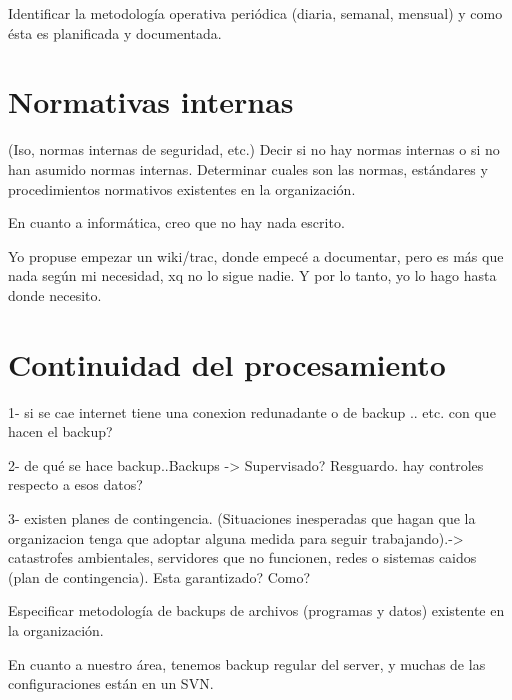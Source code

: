 \documentclass[10pt,a4paper,final]{article}
\begin{document}
Identificar la metodología operativa periódica (diaria, semanal, mensual) y como ésta es planificada y documentada.

\section{Normativas internas}
 (Iso, normas internas de seguridad, etc.) Decir si no hay normas internas o si no han asumido normas internas.
 Determinar cuales son las normas, estándares y procedimientos normativos existentes en la organización.

\begin{scriptsize}
En cuanto a informática, creo que no hay nada escrito.

Yo propuse empezar un wiki/trac, donde empecé a documentar, pero es más que nada según mi necesidad, xq no lo sigue nadie. Y por lo tanto, yo lo hago hasta donde necesito. 
\end{scriptsize}

\section{Continuidad del procesamiento}
1- si se cae internet tiene una conexion redunadante o de backup .. etc. con que hacen el backup?

2- de qué se hace backup..Backups -> Supervisado? Resguardo. hay controles respecto a esos datos?

3- existen planes de contingencia.
 (Situaciones inesperadas que hagan que la organizacion tenga que adoptar alguna medida para seguir trabajando).-> catastrofes ambientales, servidores que no funcionen, redes o sistemas caidos (plan de contingencia). Esta garantizado? Como?

 Especificar metodología de backups de archivos (programas y datos) existente en la organización.

\begin{scriptsize}
En cuanto a nuestro área, tenemos backup regular del server, y muchas de las configuraciones están en un SVN. 
\end{scriptsize}
\end{document}
